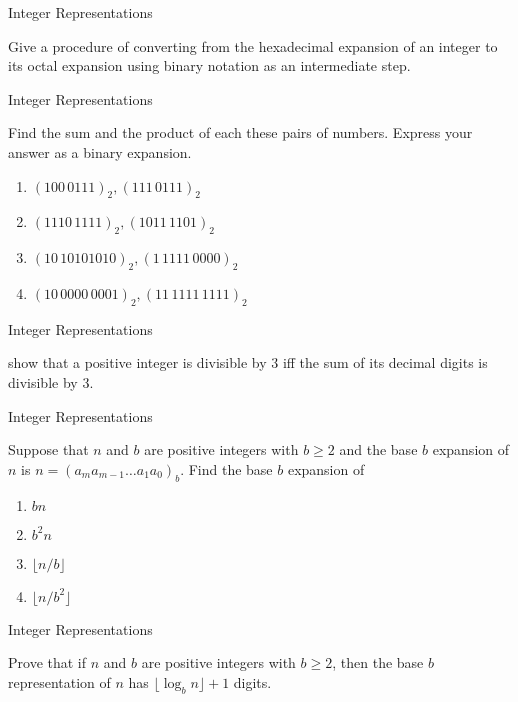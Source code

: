 \documentclass{beamer}
\begin{document}
\begin{frame}[t]{Integer Representations}
    \begin{example}
        Give a procedure of converting from the hexadecimal expansion of an integer to its octal expansion using binary notation as an intermediate step. 
    \end{example}
\end{frame}

\begin{frame}[t]{Integer Representations}
    \begin{example}
        Find the sum and the product of each these pairs of numbers. Express your answer as a binary expansion. \begin{enumerate}
            \item $(100 \, 0111)_2, (111 \, 0111)_2$
            \item $(1110 \, 1111)_2, (1011 \, 1101)_2$
            \item $(10 \, 1010 1010)_2, (1 \, 1111 \, 0000)_2$
            \item $(10 \, 0000 \, 0001)_2, (11 \, 1111 \, 1111)_2$
        \end{enumerate}
    \end{example}
\end{frame}

\begin{frame}[t]{Integer Representations}
    \begin{example}
        show that a positive integer is divisible by $3$ iff the sum of its decimal digits is divisible by $3$.
    \end{example}
\end{frame}

\begin{frame}[t]{Integer Representations}
    \begin{example}
        Suppose that $n$ and $b$ are positive integers with $b \geq 2$ and the base $b$ expansion of $n$ is $n = (a_ma_{m-1}\dots a_1a_0)_b$. Find the base $b$ expansion of \begin{enumerate}
            \item $bn$
            \item $b^2n$
            \item $\lfloor n/b \rfloor$
            \item $\lfloor n/b^2 \rfloor$
        \end{enumerate}
    \end{example}
\end{frame}

\begin{frame}[t]{Integer Representations}
    \begin{example}
        Prove that if $n$ and $b$ are positive integers with $b \geq 2$, then the base $b$ representation of $n$ has $\lfloor \log_{b}{n} \rfloor + 1$ digits.
    \end{example}
\end{frame}
\end{document}
